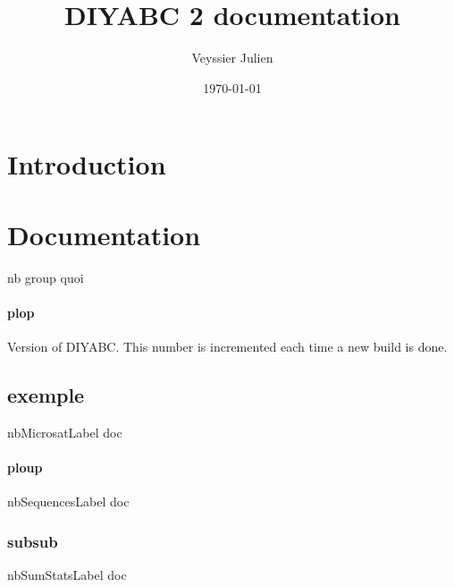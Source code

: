 \documentclass[12pt,a4paper]{article}
\author{Veyssier Julien}
\title{DIYABC 2 documentation}
\date\today
\begin{document}
\maketitle
\newpage

\tableofcontents

\newpage
 

\section{Introduction}

\section{Documentation}
        \label{doc_nbGroupLabel}
        nb group quoi

        \paragraph{plop}
        \label{doc_versionLabel}
        Version of DIYABC. This number is incremented each time a new build is done.

        \subsection{exemple}
        \label{doc_nbMicrosatLabel}
        nbMicrosatLabel doc
            \paragraph{ploup}
            \label{doc_nbSequencesLabel}
            nbSequencesLabel doc

            \subsubsection{subsub}
            \label{doc_nbSumStatsLabel}
            nbSumStatsLabel doc
\end{document}
